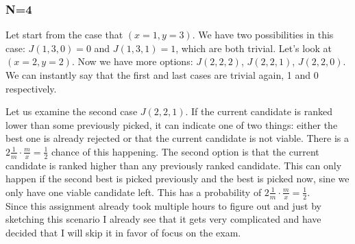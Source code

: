 \documentclass{article}
\begin{document}
\subsubsection*{N=4}



Let start from the case that $(x=1,y=3)$. We have two possibilities in this case: $J(1,3,0) = 0$ and $J(1,3,1) = 1$, which are both trivial. Let's look at $(x=2,y=2)$. Now we have more options: $J(2,2,2)$, $J(2,2,1)$, $J(2,2,0)$. We can instantly say that the first and last cases are trivial again, 1 and 0 respectively. 

Let us examine the second case $J(2,2,1)$. If the current candidate is ranked lower than some previously picked, it can indicate one of two things: either the best one is already rejected or that the current candidate is not viable. There is a $2\frac{1}{m} \cdot \frac{m}{x} = \frac{1}{2}$ chance of this happening. The second option is that the current candidate is ranked higher than any previously ranked candidate. This can only happen if the second best is picked previously and the best is picked now, sine we only have one viable candidate left. This has a probability of $2\frac{1}{m} \cdot \frac{m}{x} = \frac{1}{2}$. \\


Since this assignment already took multiple hours to figure out and just by sketching this scenario I already see that it gets very complicated and have decided that I will skip it in favor of focus on the exam. 
\end{document}

